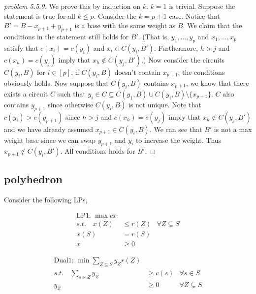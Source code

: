 \begin{proof}[problem 5.5.9]
    We prove this by induction on $k$. $k=1$ is trivial. Suppose the statement is true for all $k\leq p$. Consider the $k=p+1$ case. Notice that $B'=B-x_{p+1}+y_{p+1}$ is a base with the same weight as $B$. We claim that the conditions in the statement still holds for $B'$.
    (That is, $y_1,\dots,y_{p}$ and $x_1,\dots,x_{p}$ satisfy that $c(x_i)=c(y_i)$ and $x_i\in C(y_i,B')$. Furthermore, $h>j$ and $c(x_h)=c(y_j)$ imply that $x_h \notin C(y_j,B')$.)
    Now consider the circuits $C(y_i,B)$ for $i\in [p]$, if $C(y_i,B)$ doesn't contain $x_{p+1}$, the conditions obviously holds. Now suppose that $C(y_i,B)$ contains $x_{p+1}$, we know that there exists a circuit $C$ such that  $y_i\in C\subseteq C(y_1,B)\cup C(y_i,B)\setminus \{x_{p+1}\}$. $C$ also contains $y_{p+1}$ since otherwise $C(y_i,B)$ is not unique. Note that $c(y_i)>c(y_{p+1})$ since $h>j$ and $c(x_h)=c(y_j)$ imply that $x_h \notin C(y_j,B')$ and we have already assumed $x_{p+1}\in C(y_i,B)$.
    We can see that $B'$ is not a max weight base since we can swap $y_{p+1}$ and $y_i$ to increase the weight. Thus $x_{p+1}\notin C(y_i,B')$. All conditions holds for $B'$.
\end{proof}

\subsection{polyhedron}

Consider the following LPs,

\begin{minipage}{.45\textwidth}
\begin{align*}
    \text{LP1: } \max  cx\\
    s.t. \quad x(Z)&\leq r(Z) &\forall Z \subsetneq S\\
                x(S)&=r(S) \\
                x&\geq 0
\end{align*}
\end{minipage}
\begin{minipage}{.45\textwidth}
\begin{align*}
    \text{Dual1: } \min \sum_{Z\subseteq S} y_Z r(Z)\\
    s.t. \quad \sum_{s\in Z}y_Z&\geq c(s) & \forall s\in S\\
    y_Z&\geq 0 & \forall Z\subsetneq S
\end{align*}
\end{minipage}

